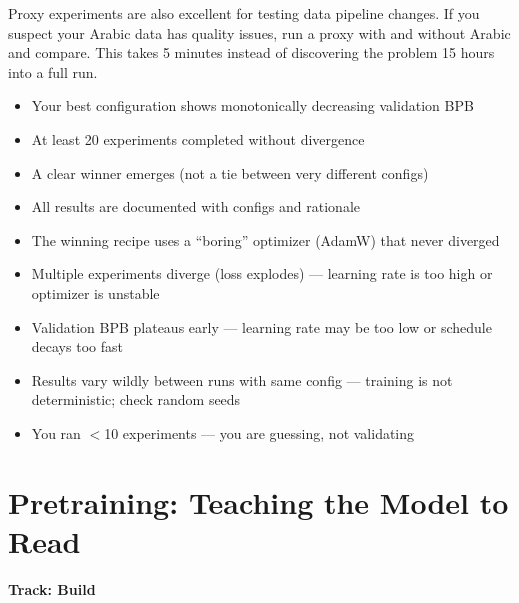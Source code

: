 \documentclass[11pt,a4paper]{article}
\begin{document}
\begin{tip}
Proxy experiments are also excellent for testing data pipeline changes. If you suspect your Arabic data has quality issues, run a proxy with and without Arabic and compare. This takes 5 minutes instead of discovering the problem 15 hours into a full run.
\end{tip}

\begin{successcheck}
\begin{itemize}[nosep]
  \item Your best configuration shows monotonically decreasing validation BPB
  \item At least 20 experiments completed without divergence
  \item A clear winner emerges (not a tie between very different configs)
  \item All results are documented with configs and rationale
  \item The winning recipe uses a ``boring'' optimizer (AdamW) that never diverged
\end{itemize}
\end{successcheck}

\begin{failuresign}
\begin{itemize}[nosep]
  \item Multiple experiments diverge (loss explodes) --- learning rate is too high or optimizer is unstable
  \item Validation BPB plateaus early --- learning rate may be too low or schedule decays too fast
  \item Results vary wildly between runs with same config --- training is not deterministic; check random seeds
  \item You ran $<$10 experiments --- you are guessing, not validating
\end{itemize}
\end{failuresign}



\section{Pretraining: Teaching the Model to Read}
\label{ch:pretraining}

\begin{center}
\colorbox{tipbg}{\textbf{Track: Build}}
\end{center}
\end{document}
